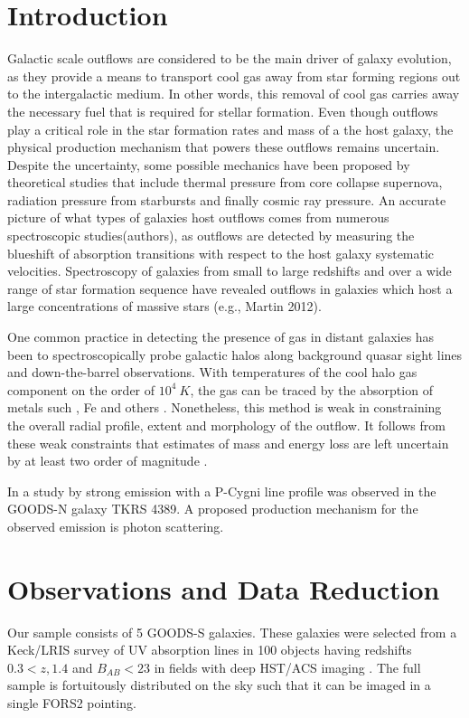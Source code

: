 \documentclass[twocolumn]{aastex6}
\begin{document}
\section{Introduction}
Galactic scale outflows are considered to be the main driver of galaxy evolution, as they provide a means to transport cool gas away from star forming regions out to the intergalactic medium. In other words, this removal of cool gas carries away the necessary fuel that is required for stellar formation. Even though outflows play a critical role in the star formation rates and mass of a the host galaxy\citep{Werk_2014}, the physical production mechanism that powers these outflows remains uncertain. Despite the uncertainty, some possible mechanics have been proposed by theoretical studies that include thermal pressure from core collapse supernova, radiation pressure from starbursts and finally cosmic ray pressure\citep{Sugahara_2017,Larson_1974,Chevalier_1985,Springel_2003}. An accurate picture of what types of galaxies host outflows comes from numerous spectroscopic studies(authors), as outflows are detected by measuring the blueshift of absorption transitions with respect to the host galaxy systematic velocities. Spectroscopy of galaxies from small to large redshifts and over a wide range of star formation sequence have revealed outflows in galaxies which host a large concentrations of massive stars (e.g., \cite{Rubin_2014} Martin 2012). 
 
One common practice in detecting the presence of gas in distant galaxies has been to spectroscopically probe galactic halos along background quasar sight lines and down-the-barrel observations. With temperatures of the cool halo gas component on the order of $10^4\ K$, the gas can be traced by the absorption of metals such , Fe and others \citep{Bordoloi_2011, Bergeron_1986}.  Nonetheless, this method is weak in constraining the overall radial profile, extent and morphology of the outflow. It follows from these weak constraints that estimates of mass and energy loss are left uncertain by at least two order of magnitude \citep{Rubin_2011}. 

In a study by \cite{Rubin_2010a} strong  emission with a P-Cygni line profile was observed in the GOODS-N galaxy TKRS 4389. A proposed production mechanism for the observed  emission is photon scattering.


\section{Observations and Data Reduction}
Our sample consists of 5 GOODS-S galaxies. These galaxies were selected from a Keck/LRIS survey of UV absorption lines in 100 objects having redshifts $0.3< z , 1.4$ and $B_{AB}< 23$ in fields with deep HST/ACS imaging \cite{Rubin_2014}. The full sample is fortuitously distributed on the sky such that it can be imaged in a single FORS2 pointing.
\end{document}

